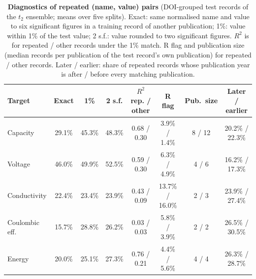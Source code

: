 \documentclass[11pt]{article}
\begin{document}
\begin{table}[t]
    \centering\small
    \caption{\textbf{Diagnostics of repeated (name, value) pairs} (DOI-grouped test records of the $t_2$ ensemble; means over five splits). Exact: same normalised name and value to six significant figures in a training record of another publication; 1\%: value within 1\% of the test value; 2 s.f.: value rounded to two significant figures. $R^2$ is for repeated / other records under the 1\% match. R flag and publication size (median records per publication of the test record's own publication) for repeated / other records. Later / earlier: share of repeated records whose publication year is after / before every matching publication.}
    \label{tab:rpd}
    \begin{tabular}{@{}lccccccc@{}}
        \toprule
        Target & Exact & 1\% & 2 s.f. & $R^2$ rep. / other & R flag & Pub.\ size & Later / earlier \\
        \midrule
        Capacity & 29.1\% & 45.3\% & 48.3\% & 0.68 / 0.30 & 3.9\% / 1.4\% & 8 / 12 & 20.2\% / 22.3\% \\
        Voltage & 46.0\% & 49.9\% & 52.5\% & 0.59 / 0.30 & 6.3\% / 4.9\% & 4 / 6 & 16.2\% / 17.3\% \\
        Conductivity & 22.4\% & 23.4\% & 23.9\% & 0.43 / 0.09 & 13.7\% / 16.0\% & 2 / 3 & 23.9\% / 27.4\% \\
        Coulombic eff. & 15.7\% & 28.8\% & 26.2\% & 0.03 / 0.03 & 5.8\% / 3.9\% & 2 / 2 & 26.5\% / 30.5\% \\
        Energy & 20.0\% & 25.1\% & 27.3\% & 0.76 / 0.21 & 4.4\% / 5.6\% & 4 / 4 & 26.3\% / 28.7\% \\
        \bottomrule
    \end{tabular}
\end{table}
\end{document}
